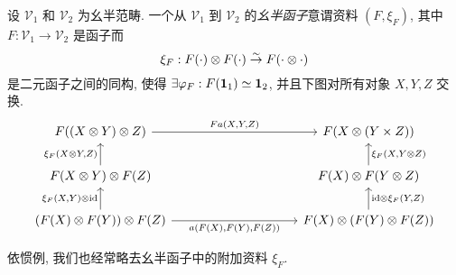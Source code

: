 \begin{definition}\label{def:monoidal-functor}
	设 $\mathcal{V}_1$ 和 $\mathcal{V}_2$ 为幺半范畴. 一个从 $\mathcal{V}_1$ 到 $\mathcal{V}_2$ 的\emph{幺半函子}意谓资料 $(F, \xi_F)$, 其中 $F: \mathcal{V}_1 \to \mathcal{V}_2$ 是函子而
	\[ \xi_F:  F(\cdot) \otimes F(\cdot) \stackrel{\sim}{\rightarrow} F(\cdot \otimes \cdot) \]
	是二元函子之间的同构, 使得 $\exists \varphi_F: F(\mathbf{1}_1) \simeq \mathbf{1}_2$, 并且下图对所有对象 $X,Y,Z$ 交换.
	\[ \begin{tikzcd}[column sep=10em]
		F((X \otimes Y) \otimes Z) \arrow[r, "{F a(X,Y,Z)}"] & F(X \otimes (Y \times Z)) \\
		F(X \otimes Y) \otimes F(Z) \arrow[u, "{\xi_F(X \otimes Y, Z)}"] & F(X) \otimes F(Y \otimes Z) \arrow[u, "{\xi_F(X, Y \otimes Z)}"'] \\
		(F(X) \otimes F(Y)) \otimes F(Z) \arrow[r, "{a(F(X), F(Y), F(Z))}"'] \arrow[u, "{\xi_F(X, Y) \otimes \identity}"] & F(X) \otimes (F(Y) \otimes F(Z)) \arrow[u, "{\identity \otimes \xi_F(Y, Z)}"']
	\end{tikzcd} \]
\end{definition}
依惯例, 我们也经常略去幺半函子中的附加资料 $\xi_F$.

